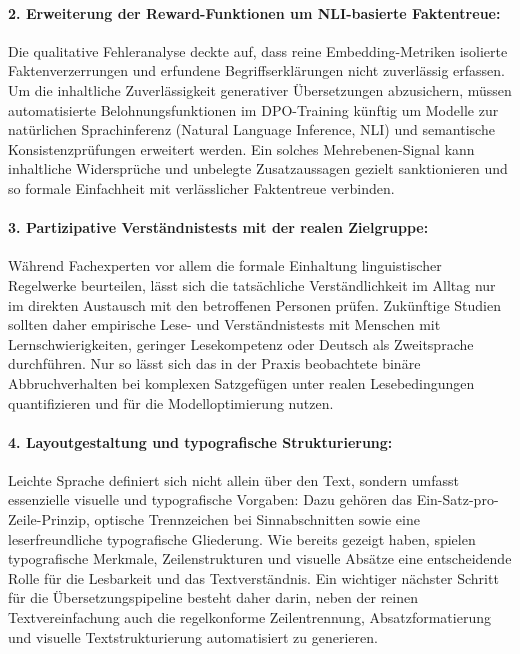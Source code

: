 \paragraph{2. Erweiterung der Reward-Funktionen um NLI-basierte Faktentreue:}
Die qualitative Fehleranalyse deckte auf, dass reine Embedding-Metriken isolierte Faktenverzerrungen und erfundene Begriffserklärungen nicht zuverlässig erfassen. Um die inhaltliche Zuverlässigkeit generativer Übersetzungen abzusichern, müssen automatisierte Belohnungsfunktionen im DPO-Training künftig um Modelle zur natürlichen Sprachinferenz (Natural Language Inference, NLI) und semantische Konsistenzprüfungen erweitert werden. Ein solches Mehrebenen-Signal kann inhaltliche Widersprüche und unbelegte Zusatzaussagen gezielt sanktionieren und so formale Einfachheit mit verlässlicher Faktentreue verbinden.

\paragraph{3. Partizipative Verständnistests mit der realen Zielgruppe:}
Während Fachexperten vor allem die formale Einhaltung linguistischer Regelwerke beurteilen, lässt sich die tatsächliche Verständlichkeit im Alltag nur im direkten Austausch mit den betroffenen Personen prüfen. Zukünftige Studien sollten daher empirische Lese- und Verständnistests mit Menschen mit Lernschwierigkeiten, geringer Lesekompetenz oder Deutsch als Zweitsprache durchführen. Nur so lässt sich das in der Praxis beobachtete binäre Abbruchverhalten bei komplexen Satzgefügen unter realen Lesebedingungen quantifizieren und für die Modelloptimierung nutzen.

\paragraph{4. Layoutgestaltung und typografische Strukturierung:}
Leichte Sprache definiert sich nicht allein über den Text, sondern umfasst essenzielle visuelle und typografische Vorgaben: Dazu gehören das Ein-Satz-pro-Zeile-Prinzip, optische Trennzeichen bei Sinnabschnitten sowie eine leserfreundliche typografische Gliederung. Wie bereits \citet{battisti2020corpus} gezeigt haben, spielen typografische Merkmale, Zeilenstrukturen und visuelle Absätze eine entscheidende Rolle für die Lesbarkeit und das Textverständnis. Ein wichtiger nächster Schritt für die Übersetzungspipeline besteht daher darin, neben der reinen Textvereinfachung auch die regelkonforme Zeilentrennung, Absatzformatierung und visuelle Textstrukturierung automatisiert zu generieren.

